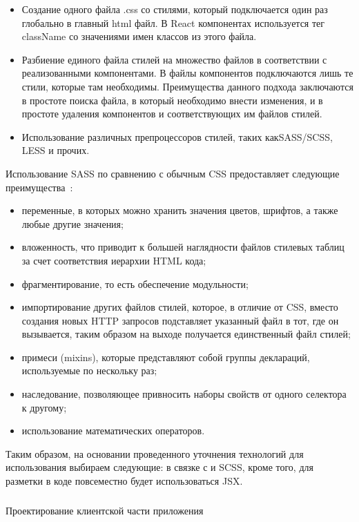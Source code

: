 \begin{itemize}
	\item Создание одного файла .css со стилями, который подключается один раз глобально в главный html файл. В React компонентах используется тег className со значениями имен классов из этого файла.
	\item Разбиение единого файла стилей на множество файлов в соответствии с реализованными компонентами. В файлы компонентов подключаются лишь те стили, которые там необходимы. Преимущества данного подхода заключаются в простоте поиска файла, в который необходимо внести изменения, и в простоте удаления компонентов и соответствующих им файлов стилей.
	\item Использование различных препроцессоров стилей, таких как\linebreak SASS/SCSS, LESS и прочих. 
\end{itemize}

Использование SASS по сравнению с обычным CSS предоставляет следующие преимущества~\cite{sass_guide}:

\begin{itemize}
	\item переменные, в которых можно хранить значения цветов, шрифтов, а также любые другие значения;
	\item вложенность, что приводит к большей наглядности файлов стилевых таблиц за счет соответствия иерархии HTML кода;
	\item фрагментирование, то есть обеспечение модульности;
	\item импортирование других файлов стилей, которое, в отличие от CSS, вместо создания новых HTTP запросов подставляет указанный файл в тот, где он вызывается, таким образом на выходе получается единственный файл стилей;
	\item примеси (mixins), которые представляют собой группы деклараций, используемые по нескольку раз;
	\item наследование, позволяющее привносить наборы свойств от одного селектора к другому;
	\item использование математических операторов.
\end{itemize}

Таким образом, на основании проведенного уточнения технологий для использования выбираем следующие: \react в связке с \mobx и SCSS, кроме того, для разметки в коде повсеместно будет использоваться JSX.

\subsubsection{} Проектирование клиентской части приложения
\label{sec:design:client:ux}

